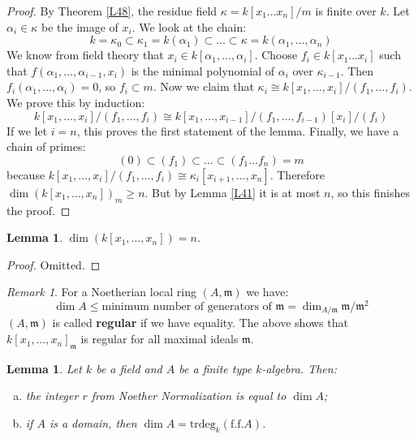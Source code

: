 \documentclass{article}
\newcommand{\fr}{\mathfrak}
\theoremstyle{plain}
\newtheorem{lem}[thm]{Lemma}
\theoremstyle{definition}
\theoremstyle{remark}
\newtheorem*{rem}{Remark}
\begin{document}
\begin{proof}
By Theorem \ref{L48}, the residue field $\kappa = k[x_1 \dots x_n]/m$ is finite over $k$. Let $\alpha_i \in \kappa$ be the image of $x_i$. We look at the chain:
\[        k = \kappa_0 \subset \kappa_1 = k(\alpha_1) \subset \dots \subset \kappa = k(\alpha_1, \dots , \alpha_n)        \]
We know from field theory that $x_i \in k[\alpha_1, \dots, \alpha_i]$. Choose $f_i \in k[x_1 \dots x_i]$ such that $f(\alpha_1, \dots, \alpha_{i-1}, x_i)$ is the minimal polynomial of $\alpha_i$ over $\kappa_{i-1}$. Then $f_i(\alpha_1, \dots, \alpha_i) = 0$, so $f_i \subset m$. Now we claim that $\kappa_i \cong k[x_1, \dots, x_i]/(f_1, \dots, f_i)$. We prove this by induction:
\[       k[x_1, \dots, x_i]/(f_1, \dots, f_i)   \cong k[x_1, \dots, x_{i-1}]/(f_1, \dots, f_{i-1}) [x_i] /(f_i)        \]
If we let $i=n$, this proves the first statement of the lemma. Finally, we have a chain of primes:
\[      (0) \subset (f_1) \subset \dots \subset (f_1 \dots f_n) = m        \]
because $ k[x_1, \dots, x_i]/(f_1, \dots, f_i) \cong \kappa_i [x_{i+1}, \dots, x_n]$. Therefore $\dim(k[x_1, \dots, x_{n}])_m \geq n$. But by Lemma \ref{L41} it is at most $n$, so this finishes the proof.
\end{proof}

\begin{lem}
\label{L53}
$\dim(k[x_1, \dots, x_n]) = n$.
\end{lem}
\begin{proof}
Omitted.
\end{proof}

\begin{rem}
For a Noetherian local ring $(A,\fr m)$ we have:
\[  \dim A \leq \text{minimum number of generators of } \fr m = \dim_{A/\fr m} \fr m/\fr m^2 \]
$(A,\fr m)$ is called \textbf{regular} if we have equality. The above shows that $k[x_1, \dots, x_n]_\fr m$ is regular for all maximal ideals $\fr m$.
\end{rem}

\begin{lem}
\label{L54}
Let $k$ be a field and $A$ be a finite type $k$-algebra. Then:
\begin{enumerate} [(a)]
\item the integer $r$ from Noether Normalization is equal to $\dim A$;
\item if $A$ is a domain, then $\dim A = \text{trdeg}_k (\text{f.f.} A)$.
\end{enumerate}
\end{lem}
\end{document}
